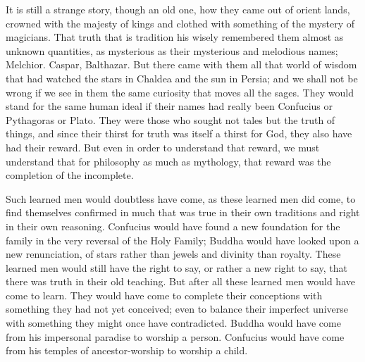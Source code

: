 It is still a strange story, though an old one, how they came out of orient lands, crowned with the majesty of kings and clothed with something of the mystery of magicians. That truth that is tradition his wisely remembered them almost as unknown quantities, as mysterious as their mysterious and melodious names; Melchior. Caspar, Balthazar. But there came with them all that world of wisdom that had watched the stars in Chaldea and the sun in Persia; and we shall not be wrong if we see in them the same curiosity that moves all the sages. They would stand for the same human ideal if their names had really been Confucius or Pythagoras or Plato. They were those who sought not tales but the truth of things, and since their thirst for truth was itself a thirst for God, they also have had their reward. But even in order to understand that reward, we must understand that for philosophy as much as mythology, that reward was the completion of the incomplete.

Such learned men would doubtless have come, as these learned men did come, to find themselves confirmed in much that was true in their own traditions and right in their own reasoning. Confucius would have found a new foundation for the family in the very reversal of the Holy Family; Buddha would have looked upon a new renunciation, of stars rather than jewels and divinity than royalty. These learned men would still have the right to say, or rather a new right to say, that there was truth in their old teaching. But after all these learned men would have come to learn. They would have come to complete their conceptions with something they had not yet conceived; even to balance their imperfect universe with something they might once have contradicted. Buddha would have come from his impersonal paradise to worship a person. Confucius would have come from his temples of ancestor-worship to worship a child.

